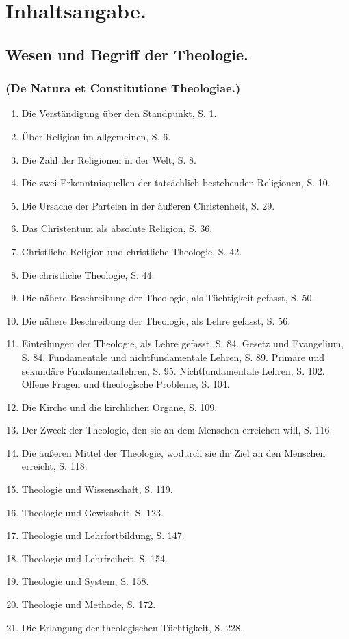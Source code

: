 \section*{Inhaltsangabe.}

\subsection*{Wesen und Begriff der Theologie.}
\subsubsection*{\normalfont (De Natura et Constitutione Theologiae.)}

\begin{enumerate}
\item Die Verständigung über den Standpunkt, S. 1.
\item Über Religion im allgemeinen, S. 6.
\item Die Zahl der Religionen in der Welt, S. 8.
\item Die zwei Erkenntnisquellen der tatsächlich bestehenden Religionen, S. 10.
\item Die Ursache der Parteien in der äußeren Christenheit, S. 29.
\item Das Christentum als absolute Religion, S. 36.
\item Christliche Religion und christliche Theologie, S. 42.
\item Die christliche Theologie, S. 44.
\item Die nähere Beschreibung der Theologie, als Tüchtigkeit gefasst, S. 50.
\item Die nähere Beschreibung der Theologie, als Lehre gefasst, S. 56.
\item Einteilungen der Theologie, als Lehre gefasst, S. 84. Gesetz und Evangelium, S. 84. Fundamentale und nichtfundamentale Lehren, S. 89. Primäre und sekundäre Fundamentallehren, S. 95. Nichtfundamentale Lehren, S. 102. Offene Fragen und theologische Probleme, S. 104.
\item Die Kirche und die kirchlichen Organe, S. 109.
\item Der Zweck der Theologie, den sie an dem Menschen erreichen will, S. 116.
\item Die äußeren Mittel der Theologie, wodurch sie ihr Ziel an den Menschen erreicht, S. 118.
\item Theologie und Wissenschaft, S. 119.
\item Theologie und Gewissheit, S. 123.
\item Theologie und Lehrfortbildung, S. 147.
\item Theologie und Lehrfreiheit, S. 154.
\item Theologie und System, S. 158.
\item Theologie und Methode, S. 172.
\item Die Erlangung der theologischen Tüchtigkeit, S. 228.
\end{enumerate}

